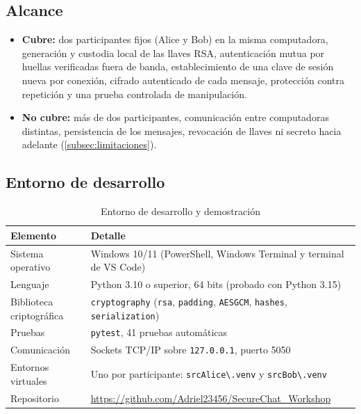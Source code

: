 \documentclass[11pt,a4paper]{article}
\newcommand{\docRepo}{https://github.com/Adriel23456/SecureChat_Workshop}
\theoremstyle{definition}
\theoremstyle{remark}
\newcommand{\code}[1]{\texttt{#1}}
\begin{document}
\subsection{Alcance}
\label{subsec:alcance}

\begin{itemize}
  \item \textbf{Cubre:} dos participantes fijos (Alice y Bob) en la misma
        computadora, generación y custodia local de las llaves RSA,
        autenticación mutua por huellas verificadas fuera de banda,
        establecimiento de una clave de sesión nueva por conexión, cifrado
        autenticado de cada mensaje, protección contra repetición y una
        prueba controlada de manipulación.
  \item \textbf{No cubre:} más de dos participantes, comunicación entre
        computadoras distintas, persistencia de los mensajes, revocación de
        llaves ni secreto hacia adelante (\cref{subsec:limitaciones}).
\end{itemize}

\subsection{Entorno de desarrollo}
\label{subsec:entorno}

\begin{table}[H]
  \centering
  \caption{Entorno de desarrollo y demostración}
  \label{tab:entorno}
  \small
  \begin{tabularx}{\linewidth}{@{}P{4cm} Y@{}}
    \toprule
    \textbf{Elemento} & \textbf{Detalle} \\
    \midrule
    Sistema operativo        & Windows 10/11 (PowerShell, Windows Terminal y terminal de VS Code) \\
    Lenguaje                 & Python 3.10 o superior, 64 bits (probado con Python 3.15) \\
    Biblioteca criptográfica & \code{cryptography} (\code{rsa}, \code{padding}, \code{AESGCM}, \code{hashes}, \code{serialization}) \\
    Pruebas                  & \code{pytest}, 41 pruebas automáticas \\
    Comunicación             & Sockets TCP/IP sobre \code{127.0.0.1}, puerto 5050 \\
    Entornos virtuales       & Uno por participante: \code{srcAlice\textbackslash .venv} y \code{srcBob\textbackslash .venv} \\
    Repositorio              & \url{\docRepo} \\
    \bottomrule
  \end{tabularx}
\end{table}
\end{document}
